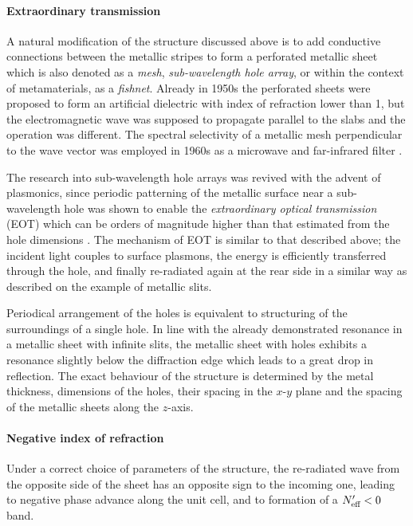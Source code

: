 \paragraph{Extraordinary transmission} %
A natural modification of the structure discussed  above is to add conductive connections between the metallic stripes to form a perforated metallic sheet which is also denoted as a \textit{mesh}, \textit{sub-wavelength hole array}, or within the context of metamaterials, as a \textit{fishnet}. Already in 1950s the perforated sheets were proposed to form an artificial dielectric \cite[p. 58]{brown1953artificial} with index of refraction lower than 1, but the electromagnetic wave was supposed to propagate parallel to the slabs and the operation was different.  %
The spectral selectivity of a metallic mesh perpendicular to the wave vector was employed in 1960s as a microwave and far-infrared filter \cite{ulrich1967effective,ulrich1967far, vogel1964transmission}.  

The research into sub-wavelength hole arrays was revived with the advent of plasmonics, since periodic patterning of the metallic surface near a sub-wavelength hole was shown to enable the \textit{extraordinary optical transmission} (EOT) which can be orders of magnitude higher than that estimated from the hole dimensions \cite{ebbesen1998extraordinary}. The mechanism of EOT is similar to that described above; the incident light couples to surface plasmons, the energy is efficiently transferred through the hole, and finally re-radiated again at the rear side in a similar way as described on the example of metallic slits. 

Periodical arrangement of the holes is equivalent to structuring of the surroundings of a single hole. In line with the already demonstrated resonance in a metallic sheet with infinite slits, the metallic sheet with holes exhibits a resonance slightly below the diffraction edge which leads to a great drop in reflection. The exact behaviour of the structure is determined by the  metal thickness, dimensions of the holes, their spacing in the $x$-$y$ plane and the spacing of the metallic sheets along the $z$-axis.

\paragraph{Negative index of refraction}%
Under a correct choice of parameters of the structure, the re-radiated wave from the opposite side of the sheet has an opposite sign to the incoming one, leading to negative phase advance along the unit cell, and to formation of a $N_{\text{eff} }'<0$ band. 

